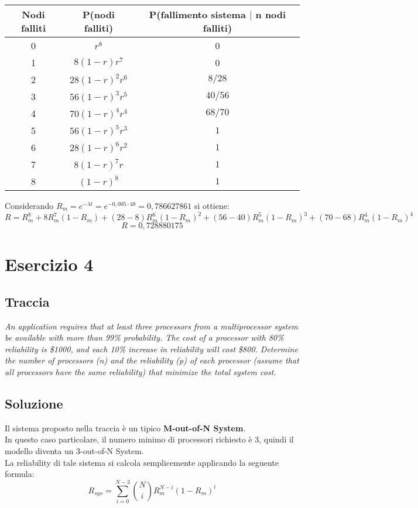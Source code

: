 \begin{tabular}{c||c|c|}

\textbf{Nodi falliti}& \textbf{P(nodi falliti)} & \textbf{P(fallimento sistema $\mid$ n nodi falliti)}\\
\hline
\hline
0 & $r^8$ & 0 \\
\hline
1 & $8(1-r)r^7$ & 0 \\
\hline
2 & $28(1-r)^2r^6$ & $8/28$ \\
\hline
3 & $56(1-r)^3r^5$ & $40/56$ \\
\hline
4 & $70(1-r)^4r^4$ & $68/70$ \\
\hline
5 & $56(1-r)^5r^3$ & $1$ \\
\hline
6 & $28(1-r)^6r^2$ & $1$ \\
\hline
7 & $8(1-r)^7r$ & $1$ \\
\hline
8 & $(1-r)^8$ & $1$ \\
\hline
\end{tabular}

\clearpage

Considerando $R_m=e^{-\lambda t}=e^{-0,005\cdot 48}=0,786627861$ si ottiene:
$$R=R_m^8+8R_m^7(1-R_m)+(28-8)R_m^6(1-R_m)^2+(56-40)R_m^5(1-R_m)^3+(70-68)R_m^4(1-R_m)^4$$
$$R=0,728880175$$

\clearpage
\section{Esercizio 4}
\subsection{Traccia}
\textit{An application requires that at least three processors from a multiprocessor
system be available with more than 99\% probability. The cost of a processor with
80\% reliability is \$1000, and each 10\% increase in reliability will cost \$800.
Determine the number of processors (n) and the reliability (p) of each processor
(assume that all processors have the same reliability) that minimize the total
system cost.}

\clearpage
\subsection{Soluzione}
Il sistema proposto nella traccia è un tipico \textbf{M-out-of-N System}.\\
In questo caso particolare, il numero minimo di processori richiesto è 3, quindi
il modello diventa un 3-out-of-N System.\\
La reliability di tale sistema si calcola semplicemente applicando la seguente
formula:
$$R_{sys} = \sum_{i=0}^{N-3} \binom{N}{i} R_m^{N-i}(1-R_m)^i$$
\vspace{0.4cm}

